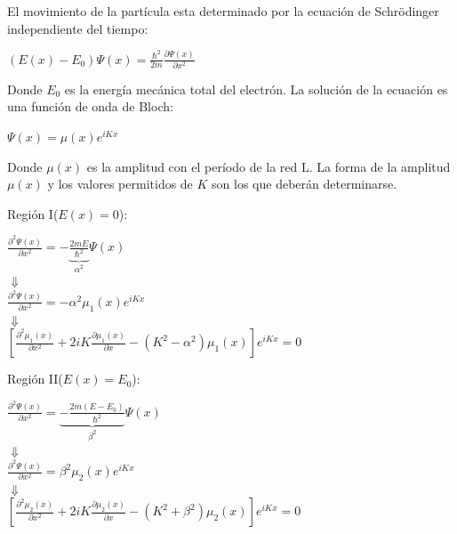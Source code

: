 \documentclass[oneside]{book}
\numberwithin{equation}{section}
\numberwithin{figure}{section}
\numberwithin{table}{section}
\begin{document}
			El movimiento de la partícula esta determinado por la ecuación de Schrödinger independiente del tiempo:
			
			\begin{center}
				$\displaystyle (E(x)-E_0)\Psi(x)=\frac{\hbar^2}{2m}\frac{\partial \Psi(x)}{\partial x^2}$
			\end{center}
			
			Donde $E_0$ es la energía mecánica total del electrón. La solución de la ecuación es una función de onda de Bloch:
			
			\begin{center}
				$\displaystyle \Psi(x)=\mu(x)e^{i K x}$
			\end{center}
			
			Donde $\mu(x)$ es la amplitud con el período de la red L. La forma de la amplitud $\mu(x)$ y los valores permitidos de $K$ son los que deberán determinarse.\\
			
			\begin{minipage}[t]{0.5\textwidth}
				\begin{center}
					Región I($E(x)=0$):\\
				\end{center}
				\begin{center}
					$\displaystyle \frac{\partial^2 \Psi(x)}{\partial x^2}=-\underbrace{\frac{2mE}{\hbar^2}}_{\alpha^2}\Psi(x)$\\
					$\Downarrow$\\
					$\displaystyle \frac{\partial^2 \Psi(x)}{\partial x^2}=-\alpha^2 \mu_1(x) e^{i K x}$\\
					$\Downarrow$\\
					$\displaystyle \left[\frac{\partial^2 \mu_1(x)}{\partial x^2}+2iK\frac{\partial \mu_1(x)}{\partial x}-(K^2-\alpha^2)\mu_1(x)\right]e^{i K x}=0$\\			
				\end{center}
			\end{minipage}
			\begin{minipage}[t]{0.5\textwidth}
				\begin{center}
					Región II($E(x)=E_0$):\\
				\end{center}
				\begin{center}
					$\displaystyle \frac{\partial^2 \Psi(x)}{\partial x^2}=\underbrace{-\frac{2m(E-E_0)}{\hbar^2}}_{\beta^2}\Psi(x)$\\
					$\Downarrow$\\
					$\displaystyle \frac{\partial^2 \Psi(x)}{\partial x^2}=\beta^2 \mu_2(x) e^{i K x}$\\
					$\Downarrow$\\
					$\displaystyle \left[\frac{\partial^2 \mu_2(x)}{\partial x^2}+2iK\frac{\partial \mu_2(x)}{\partial x}-(K^2+\beta^2)\mu_2(x)\right]e^{i K x}=0$\\
				\end{center}
			\end{minipage}
			
\end{document}
